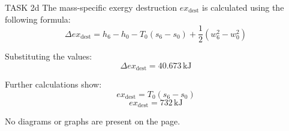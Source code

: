 TASK 2d  
The mass-specific exergy destruction \( ex_{\text{dest}} \) is calculated using the following formula:  
\[
\Delta ex_{\text{dest}} = h_{6} - h_{0} - T_{0}(s_{6} - s_{0}) + \frac{1}{2}(w_{6}^2 - w_{0}^2)
\]  

Substituting the values:  
\[
\Delta ex_{\text{dest}} = 40.673 \, \text{kJ}  
\]  

Further calculations show:  
\[
ex_{\text{dest}} = T_{0}(s_{6} - s_{0})  
\]  
\[
ex_{\text{dest}} = 732 \, \text{kJ}  
\]  

No diagrams or graphs are present on the page.